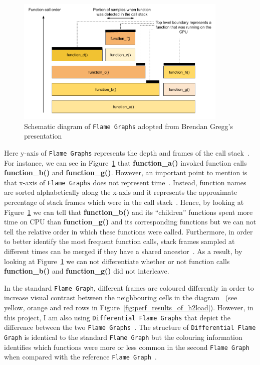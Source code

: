 \documentclass[12pt,a4paper,twoside,openright]{report}
\begin{document}
    \begin{figure}[H]
    \centering
    \includegraphics[width=0.9\textwidth]{figs/Flame_Graphs_explanation.png}
    \caption[Schematic diagram of \texttt{Flame Graphs}]{Schematic diagram of \texttt{Flame Graphs} adopted from Brendan Gregg's presentation~\cite{USENIX_ATC2017_flamegraphs}}
    \label{fig:Flame_Graphs_explanation}
    \end{figure}

Here y-axis of \texttt{Flame Graphs} represents the depth and frames of the call stack~\cite{CPU_Flame_graphs}.
For instance, we can see in Figure~\ref{fig:Flame_Graphs_explanation} that \textbf{function\_a()} invoked function calls \textbf{function\_b()} and \textbf{function\_g()}. 
However, an important point to mention is that x-axis of \texttt{Flame Graphs} does not represent time~\cite{CPU_Flame_graphs}.
Instead, function names are sorted alphabetically along the x-axis and it represents the approximate percentage of stack frames which were in the call stack~\cite{CPU_Flame_graphs}.
Hence, by looking at Figure~\ref{fig:Flame_Graphs_explanation} we can tell that \textbf{function\_b()} and its \enquote{children} functions spent more time on CPU than \textbf{function\_g()} and its corresponding functions but we can not tell the relative order in which these functions were called.
Furthermore, in order to better identify the most frequent function calls, stack frames sampled at different times can be merged if they have a shared ancestor~\cite{CPU_Flame_graphs}.
As a result, by looking at Figure~\ref{fig:Flame_Graphs_explanation} we can not differentiate whether or not function calls \textbf{function\_b()} and \textbf{function\_g()} did not interleave.

In the standard \texttt{Flame Graph}, different frames are coloured differently in order to increase visual contrast between the neighbouring cells in the diagram~\cite{CPU_Flame_graphs} (see yellow, orange and red rows in Figure~\ref{fig:perf_results_of_h2load}).
However, in this project, I am also using \texttt{Differential Flame Graphs} that depict the difference between the two \texttt{Flame Graphs}~\cite{Differential_Flame_Graphs}.
The structure of \texttt{Differential Flame Graph} is identical to the standard \texttt{Flame Graph} but the colouring information identifies which functions were more or less common in the second \texttt{Flame Graph} when compared with the reference \texttt{Flame Graph}~\cite{Differential_Flame_Graphs}.
\end{document}
